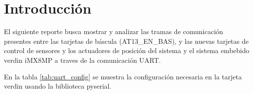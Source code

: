 \documentclass[12pt,a4paper]{article}
\begin{document}
    
    \makedoctitle
    \thispagestyle{fancy}
    
    \section{Introducción}
    \begin{twocolsection}
        El siguiente reporte busca mostrar y analizar las tramas de comunicación presentes entre las tarjetas de báscula (AT13\_EN\_BAS), y las nuevas tarjetas de control de sensores y los actuadores de posición del sistema y el sistema embebido verdin iMX8MP a traves de la comunicación UART.
        
        En la tabla \ref{tab:uart_config} se muestra la configuración necesaria en la tarjeta verdin usando la biblioteca pyserial.
    \end{twocolsection}
\end{document}
